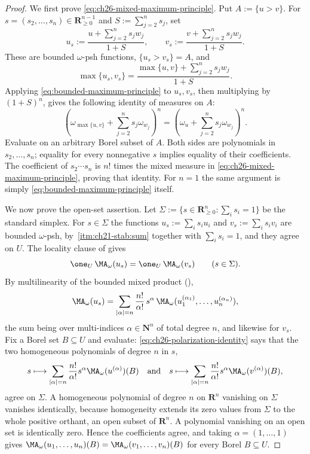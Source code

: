 \begin{proof}
We first prove \eqref{eq:ch26-mixed-maximum-principle}.  Put
$A:=\{u>v\}$.  For $s=(s_2,\ldots,s_n)\in\mathbf R_{\geq0}^{n-1}$
and $S:=\sum_{j=2}^ns_j$, set
\[
 u_s:=\frac{u+\sum_{j=2}^ns_jw_j}{1+S},
 \qquad
 v_s:=\frac{v+\sum_{j=2}^ns_jw_j}{1+S}.
\]
These are bounded $\omega$-psh functions,
$\{u_s>v_s\}=A$, and
\[
 \max\{u_s,v_s\}
 =\frac{\max\{u,v\}+\sum_{j=2}^ns_jw_j}{1+S}.
\]
Applying \eqref{eq:bounded-maximum-principle} to $u_s,v_s$, then
multiplying by $(1+S)^n$, gives the following identity of measures on
$A$:
\[
 \left(\omega_{\max\{u,v\}}+\sum_{j=2}^ns_j\omega_{w_j}\right)^{\!n}
 =
 \left(\omega_u+\sum_{j=2}^ns_j\omega_{w_j}\right)^{\!n}.
\]
Evaluate on an arbitrary Borel subset of $A$.  Both sides are
polynomials in $s_2,\ldots,s_n$; equality for every nonnegative $s$
implies equality of their coefficients.  The coefficient of
$s_2\cdots s_n$ is $n!$ times the mixed measure in
\eqref{eq:ch26-mixed-maximum-principle}, proving that identity.  For
$n=1$ the same argument is simply
\eqref{eq:bounded-maximum-principle} itself.

We now prove the open-set assertion.
Let $\Sigma:=\{s\in\mathbf R_{\geq0}^n:\sum_is_i=1\}$ be the standard
simplex.  For $s\in\Sigma$ the functions
$u_s:=\sum_is_iu_i$ and $v_s:=\sum_is_iv_i$ are bounded
$\omega$-psh, by
\,\cref{itm:ch21-stab:sum} together with
$\sum_is_i=1$, and they agree on $U$.  The locality clause of
 gives
\begin{equation}
\label{eq:ch26-polarization-identity}
 \one_U\,\MA_\omega(u_s)=\one_U\,\MA_\omega(v_s)
 \qquad(s\in\Sigma).
\end{equation}
By multilinearity of the bounded mixed product
(),
\[
 \MA_\omega(u_s)
 =\sum_{|\alpha|=n}\frac{n!}{\alpha!}\,s^\alpha\,
   \MA_\omega(u_1^{(\alpha_1)},\ldots,u_n^{(\alpha_n)}),
\]
the sum being over multi-indices $\alpha\in\mathbf N^n$ of total degree
$n$, and likewise for $v_s$.  Fix a Borel set $B\subseteq U$ and
evaluate: \eqref{eq:ch26-polarization-identity} says that the two
homogeneous polynomials of degree $n$ in $s$,
\[
 s\longmapsto\sum_{|\alpha|=n}\frac{n!}{\alpha!}s^\alpha
  \MA_\omega(u^{(\alpha)})(B)
 \quad\text{and}\quad
 s\longmapsto\sum_{|\alpha|=n}\frac{n!}{\alpha!}s^\alpha
  \MA_\omega(v^{(\alpha)})(B),
\]
agree on $\Sigma$.  A homogeneous polynomial of degree $n$ on
$\mathbf R^n$ vanishing on $\Sigma$ vanishes identically, because homogeneity extends its zero values from $\Sigma$ to the whole
positive orthant, an open subset of $\mathbf R^n$.  A polynomial vanishing
on an open set is identically zero.  Hence the
coefficients agree, and taking $\alpha=(1,\ldots,1)$ gives
$\MA_\omega(u_1,\ldots,u_n)(B)=\MA_\omega(v_1,\ldots,v_n)(B)$ for every
Borel $B\subseteq U$.
\end{proof}


